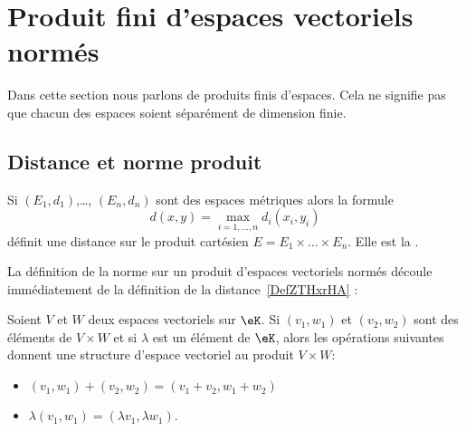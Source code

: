 
\section{Produit fini d'espaces vectoriels normés}
\label{sec_prod}

Dans cette section nous parlons de produits finis d'espaces. Cela ne signifie pas que chacun des espaces soient séparément de dimension finie.

\subsection{Distance et norme produit}

\begin{propositionDef}    \label{DefZTHxrHA}
	Si \( (E_1,d_1)\),\ldots, \( (E_n,d_n)\) sont des espaces métriques alors la formule
	\begin{equation}
		d(x,y)=\max_{i=1,\ldots, n}d_i(x_i,y_i)
	\end{equation}
	définit une distance sur le produit cartésien \( E=E_1\times\ldots\times E_n\). Elle est la .
\end{propositionDef}

La définition de la norme sur un produit d'espaces vectoriels normés découle immédiatement de la définition de la distance~\ref{DefZTHxrHA} :
\begin{lemmaDef}  \label{DefFAJgTCE}
	Soient \( V\) et \( W\) deux espaces vectoriels sur \( \eK\). Si \( (v_1,w_1)\) et \( (v_2,w_2)\) sont des éléments de \( V\times W\) et si \( \lambda\) est un élément de \( \eK\), alors les opérations suivantes donnent une structure d'espace vectoriel au produit \( V\times W\):
	\begin{itemize}
		\item \( (v_1,w_1)+(v_2,w_2)=(v_1+v_2,w_1+w_2)\)
		\item \( \lambda(v_1,w_1)=(\lambda v_1,\lambda w_1)\).
	\end{itemize}
\end{lemmaDef}

